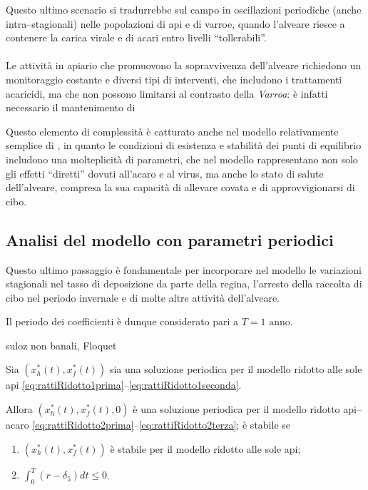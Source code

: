 Questo ultimo scenario si tradurrebbe sul campo in oscillazioni periodiche (anche intra--stagionali) nelle popolazioni
di api e di varroe, quando l'alveare riesce a contenere la carica virale e di acari entro livelli ``tollerabili''.

\paragraph{}
Le attività in apiario che promuovono la sopravvivenza dell'alveare richiedono un monitoraggio costante e diversi tipi di interventi, che includono i trattamenti acaricidi, ma che non possono limitarsi al contrasto della \emph{Varroa}: è infatti necessario il mantenimento di 

Questo elemento di complessità è catturato anche nel modello relativamente semplice di \cite{ratti2017}, in quanto le condizioni di esistenza e stabilità dei punti di equilibrio includono una molteplicità di parametri, che nel modello rappresentano non solo gli effetti ``diretti'' dovuti all'acaro e al virus, ma anche lo stato di salute dell'alveare, compresa la sua capacità di allevare covata e di approvvigionarsi di cibo.


\subsection{Analisi del modello con parametri periodici}
\label{sez:paramPeriodici}
Questo ultimo passaggio è fondamentale per incorporare nel modello le variazioni stagionali nel tasso di deposizione da parte della regina, l'arresto della raccolta di cibo nel periodo invernale e di molte altre attività dell'alveare.

Il periodo dei coefficienti è dunque considerato pari a $T= 1 \text{ anno}$.

suloz non banali, Floquet

\begin{proposizione}
    Sia $\left( x_h^*(t), x_f^*(t) \right)$ sia una soluzione periodica per il modello ridotto alle sole api \eqref{eq:rattiRidotto1prima}--\eqref{eq:rattiRidotto1seconda}.

    Allora $\left( x_h^*(t), x_f^*(t), 0 \right)$ è una soluzione periodica per il modello ridotto api--acaro \eqref{eq:rattiRidotto2prima}--\eqref{eq:rattiRidotto2terza}; è stabile se
    \begin{enumerate}
        \item $\left( x_h^*(t), x_f^*(t) \right)$ è stabile per il modello ridotto alle sole api;
        \item $\int_0^T (r - \delta_5) dt \leq 0$.
    \end{enumerate}
\end{proposizione}


